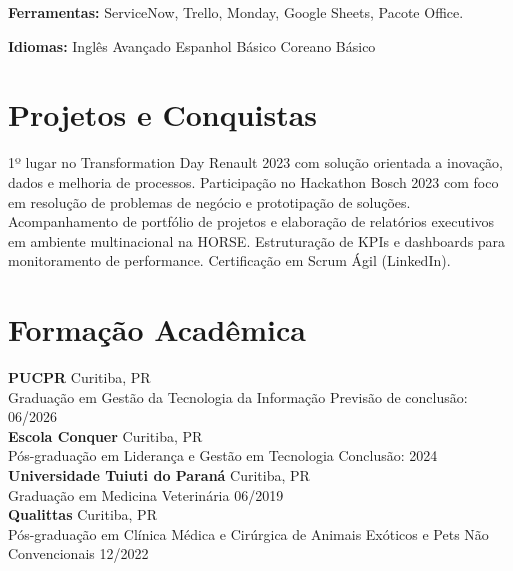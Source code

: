 \documentclass[11pt,a4paper]{article}
\begin{document}
\textbf{Ferramentas:} ServiceNow, Trello, Monday, Google Sheets, Pacote Office.

\textbf{Idiomas:} Inglês Avançado \enspace\textbullet\enspace Espanhol Básico \enspace\textbullet\enspace Coreano Básico

\section{Projetos e Conquistas}

1º lugar no Transformation Day Renault 2023 com solução orientada a inovação, dados e melhoria de processos. Participação no Hackathon Bosch 2023 com foco em resolução de problemas de negócio e prototipação de soluções. Acompanhamento de portfólio de projetos e elaboração de relatórios executivos em ambiente multinacional na HORSE. Estruturação de KPIs e dashboards para monitoramento de performance. Certificação em Scrum Ágil (LinkedIn).

\section{Formação Acadêmica}

\textbf{PUCPR} \hfill Curitiba, PR\\
Graduação em Gestão da Tecnologia da Informação \hfill Previsão de conclusão: 06/2026\\[6pt]

\textbf{Escola Conquer} \hfill Curitiba, PR\\
Pós-graduação em Liderança e Gestão em Tecnologia \hfill Conclusão: 2024\\[6pt]

\textbf{Universidade Tuiuti do Paraná} \hfill Curitiba, PR\\
Graduação em Medicina Veterinária \hfill 06/2019\\[6pt]

\textbf{Qualittas} \hfill Curitiba, PR\\
Pós-graduação em Clínica Médica e Cirúrgica de Animais Exóticos e Pets Não Convencionais \hfill 12/2022
\end{document}
